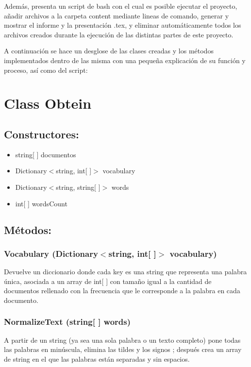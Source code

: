 \documentclass[a4paper,12pt,]{article}
\begin{document}
Además, presenta un script de bash con el cual es posible ejecutar el proyecto, añadir archivos a la carpeta 
content mediante lineas de comando, generar y mostrar el informe y la presentación .tex, y eliminar automáticamente
todos los archivos creados durante la ejecución de las distintas partes de este proyecto.

A continuación se hace un desglose de las clases creadas y los métodos implementados dentro de las misma con 
una pequeña explicación de su función y proceso, así como del script:

\section*{Class Obtein}

\subsection*{Constructores: }
\begin{itemize}
    \item string[ ]  documentos
    \item Dictionary$<$string, int[ ]$>$ vocabulary
    \item Dictionary$<$string, string[ ]$>$ words
    \item int[ ] wordsCount
\end{itemize}

\subsection*{Métodos:}

\subsubsection*{Vocabulary (Dictionary$<$string, int[ ]$>$ vocabulary)}
Devuelve un diccionario donde cada key es una string que representa una palabra única, asociada a un array de 
int[ ] con tamaño igual a la cantidad de documentos rellenado con la frecuencia que le corresponde a la palabra 
en cada documento.

\subsubsection*{NormalizeText (string[ ] words)}
A partir de un string (ya sea una sola palabra o un texto completo) pone todas las palabras en minúscula, 
elimina las tildes y los signos %
; después crea un array de string en el que las palabras están separadas y sin espacios.
\end{document}
